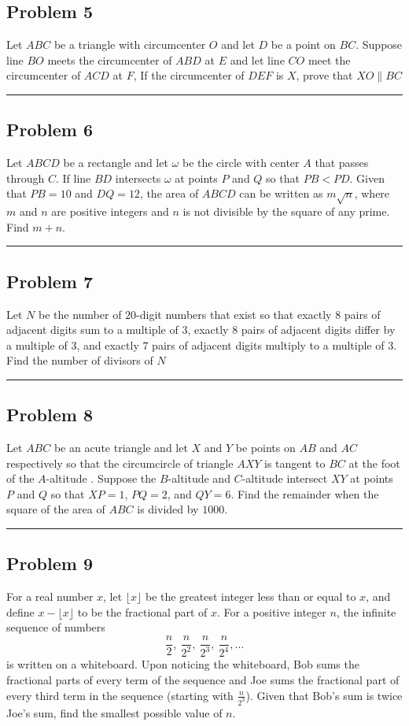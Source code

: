\documentclass[10pt]{scrartcl}\usepackage[utf8]{inputenc}\usepackage{amsmath}\usepackage{amsfonts} \usepackage{tikz}\usepackage{asymptote}\usepackage[most]{tcolorbox}\usepackage{fancyhdr}\usepackage{geometry}\usepackage{color}\usepackage{lewis}\usepackage[T1]{fontenc}\usepackage[explicit]{titlesec}\usepackage{fontawesome}\usepackage{sansmathfonts}\pagestyle{fancy}
\begin{document}
\subsection*{Problem 5}
Let $ABC$ be a triangle with circumcenter $O$ and let $D$ be a point on $BC$. Suppose line $BO$ meets the circumcenter of $ABD$ at $E$ and let line $CO$ meet the circumcenter of $ACD$ at $F$, If the circumcenter of $DEF$ is $X$, prove that $XO\parallel{BC}$
\\
\noindent\rule{14.5cm}{0.8pt}
\subsection*{Problem 6}
Let $ABCD$ be a rectangle and let $\omega$ be the circle with center $A$ that passes through $C$. If line $BD$ intersects $\omega$ at points $P$ and $Q$ so that $PB < PD$. Given that $PB = 10$ and $DQ = 12$, the area of $ABCD$ can be written as $m\sqrt{n}$, where $m$ and $n$ are positive integers and $n$ is not divisible by the square of any prime. Find $m+n$.
\\
\noindent\rule{14.5cm}{0.8pt}
\subsection*{Problem 7}
Let $N$ be the number of $20$-digit numbers that exist so that exactly 8 pairs of adjacent digits sum to a multiple of $3$, exactly $8$ pairs of adjacent digits differ by a multiple of $3$, and exactly $7$ pairs of adjacent digits multiply to a multiple of $3$. Find the number of divisors of $N$
\\
\noindent\rule{14.5cm}{0.8pt}
\subsection*{Problem 8}
Let $ABC$ be an acute triangle and let $X$ and $Y$ be points on $AB$ and $AC$ respectively so that the circumcircle of triangle $AXY$ is tangent to $BC$ at the foot of the $A$-altitude . Suppose the $B$-altitude and $C$-altitude intersect $XY$ at points $P$ and $Q$ so that $XP=1$, $PQ=2$, and $QY=6$. Find the remainder when the square of the area of $ABC$ is divided by $1000$.
\\
\noindent\rule{14.5cm}{0.8pt}
\subsection*{Problem 9 }
For a real number $x$, let $\lfloor x\rfloor$ be the greatest integer less than or equal to $x$, and define $x-\lfloor x\rfloor$ to be the fractional part of $x$. For a positive integer $n$, the infinite sequence of numbers 
\[\frac{n}{2},\ \frac{n}{2^2},\ \frac{n}{2^3},\ \frac{n}{2^4}, \dots\]
 is written on a whiteboard. Upon noticing the whiteboard, Bob sums the fractional parts of every term of the sequence and Joe sums the fractional part of every third term in the sequence (starting with $\tfrac{n}{2^3}$). Given that Bob's sum is twice Joe's sum, find the smallest possible value of $n$.
\end{document}
